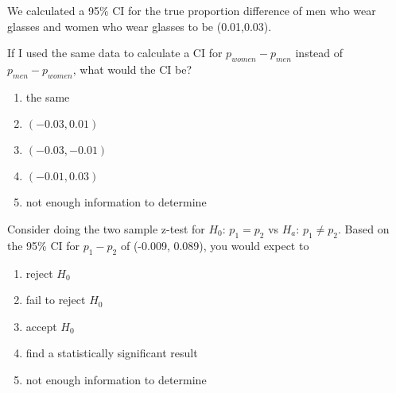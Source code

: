 \begin{frame}
We calculated a 95\% CI for the true proportion difference of men who wear glasses and women who wear glasses to be (0.01,0.03).
\begin{clicker}{If I used the same data to calculate a CI for $p_{women}-p_{men}$ instead of $p_{men}-p_{women}$, what would the CI be?}
\begin{enumerate}
    \item
    the same
    \item
    $(-0.03, 0.01)$
    \item
    $(-0.03, -0.01)$
    \item
    $(-0.01, 0.03)$
    \item
    not enough information to determine
\end{enumerate}
\end{clicker}
\end{frame}

\begin{frame}
\begin{clicker}{Consider doing the two sample z-test for $H_0$: $p_{1}=p_{2}$ vs $H_a$: $p_{1}\neq p_{2}$.  Based on the 95\% CI for $p_1-p_2$ of (-0.009, 0.089), you would expect to}
\begin{enumerate}
    \item
    reject $H_0$
    \item
    fail to reject $H_0$
    \item
    accept $H_0$
    \item
    find a statistically significant result
    \item
    not enough information to determine
\end{enumerate}
\end{clicker}
\end{frame}

